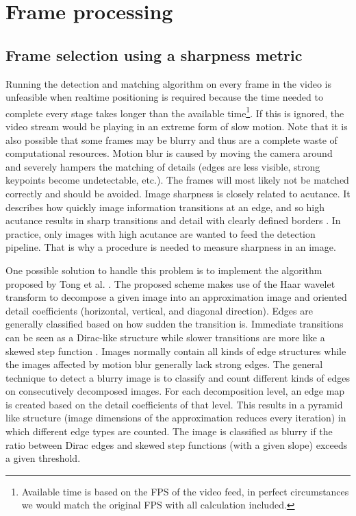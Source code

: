 \section{Frame processing}
\label{sec:preprocessing}

\subsection{Frame selection using a sharpness metric}
\label{subsec:blur-detection}

Running the detection and matching algorithm on every frame in the video is unfeasible when realtime positioning is required because the time needed to complete every stage takes longer than the available time\footnote{Available time is based on the FPS of the video feed, in perfect circumstances we would match the original FPS with all calculation included.}. If this is ignored, the video stream would be playing in an extreme form of slow motion. Note that it is also possible that some frames may be blurry and thus are a complete waste of computational resources. Motion blur is caused by moving the camera around and  severely hampers the matching of details (edges are less visible, strong keypoints become undetectable, etc.).  The frames will most likely not be matched correctly and should be avoided. Image sharpness is closely related to acutance. It describes how quickly image information transitions at an edge, and so high acutance results in sharp transitions and detail with clearly defined borders \cite{tutorialSharpness}. In practice, only images with high acutance are  wanted  to feed the detection pipeline. That is why a procedure is needed to measure sharpness in an image.

One possible solution to handle this problem is to implement the algorithm proposed by Tong et al. \cite{Hanghang2004}. The proposed scheme makes use of the Haar wavelet transform to decompose a given image into an approximation image and oriented detail coefficients (horizontal, vertical, and diagonal direction). Edges are generally classified based on how sudden the transition is. Immediate transitions can be seen as a Dirac-like structure while slower transitions are more like a skewed step function \cite{Hanghang2004}\cite{712011}. Images normally contain all kinds of edge structures while the images affected by motion blur generally lack strong edges. The general technique to detect a blurry image is to classify and count different kinds of edges on consecutively decomposed images. For each decomposition level, an edge map is created based on the detail coefficients of that level. This results in a pyramid like structure (image dimensions of the approximation reduces every iteration) in which different edge types are counted. The image is classified as blurry if the ratio between Dirac edges and skewed step functions (with a given slope) exceeds a given threshold.

